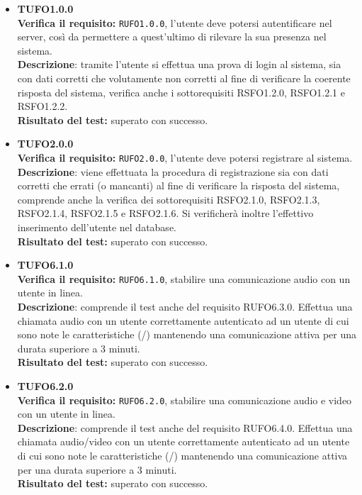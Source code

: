 \begin{itemize}
\item \textbf{TUFO1.0.0}\\
\textbf{Verifica il requisito:} \texttt{RUFO1.0.0}, l'utente deve potersi autentificare nel server, così da permettere a quest'ultimo di rilevare la sua presenza nel sistema.\\
\textbf{Descrizione}: tramite l'utente  si effettua una prova di login al sistema, sia con dati corretti che volutamente non corretti al fine di verificare la coerente risposta del sistema, verifica anche i sottorequisiti RSFO1.2.0, RSFO1.2.1 e RSFO1.2.2.\\
\textbf{Risultato del test:} superato con successo.

\item \textbf{TUFO2.0.0}\\
\textbf{Verifica il requisito:} \texttt{RUFO2.0.0}, l'utente deve potersi registrare al sistema.\\
\textbf{Descrizione}: viene effettuata la procedura di registrazione sia con dati corretti che errati (o mancanti) al fine di verificare la risposta del sistema, comprende anche la verifica dei sottorequisiti RSFO2.1.0, RSFO2.1.3, RSFO2.1.4, RSFO2.1.5 e RSFO2.1.6. Si verificherà inoltre l'effettivo inserimento dell'utente nel database.\\
\textbf{Risultato del test:} superato con successo.

\item \textbf{TUFO6.1.0}\\ 
\textbf{Verifica il requisito:} \texttt{RUFO6.1.0}, stabilire una comunicazione audio con un utente in linea.\\
\textbf{Descrizione}: comprende il test anche del requisito RUFO6.3.0. Effettua una chiamata audio con un utente  correttamente autenticato ad un utente  di cui sono note le caratteristiche (/) mantenendo una comunicazione attiva per una durata superiore a 3 minuti.\\
\textbf{Risultato del test:} superato con successo.

\item \textbf{TUFO6.2.0}\\
\textbf{Verifica il requisito:} \texttt{RUFO6.2.0}, stabilire una comunicazione audio e video con un utente in linea.\\
\textbf{Descrizione}: comprende il test anche del requisito RUFO6.4.0. Effettua una chiamata audio/video con un utente  correttamente autenticato ad un utente  di cui sono note le caratteristiche (/) mantenendo una comunicazione attiva per una durata superiore a 3 minuti.\\
\textbf{Risultato del test:} superato con successo.


\end{itemize}
